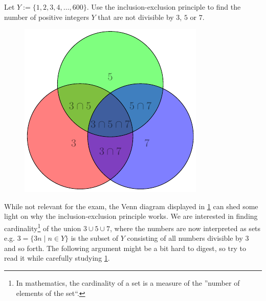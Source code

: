 \documentclass[a4paper, english, 12pt]{article} %
\begin{document}
\titlebox

\begin{problem}[2]
  Let $Y := \{ 1,2,3,4,\ldots,600 \}$. Use the inclusion-exclusion principle to
  find the number of positive integers $Y$ that are not divisible by $3$, $5$ or $7$.
\end{problem}


\begin{answer}
  \begin{figure}[htbp!]
    \centering
    \includegraphics{Venn-Diagram-5}
    \caption{}
    \label{fig:venn}
  \end{figure}
  While not relevant for the exam, the Venn diagram displayed in \cref{fig:venn}
  can shed some light on why the inclusion-exclusion principle works. We are
  interested in finding cardinality\footnote{In mathematics, the cardinality of
    a set is a measure of the ''number of elements of the set``.} of the union
  $3 \cup 5 \cup 7$, where the numbers are now interpreted as sets e.g. $3 =
  \{3n \mid n \in Y\}$ is the subset of $Y$ consisting of all numbers divisible
  by 3 and so forth. The following argument might be a bit hard to digest, so
  try to read it while carefully studying \cref{fig:venn}.


\end{answer}
\end{document}
